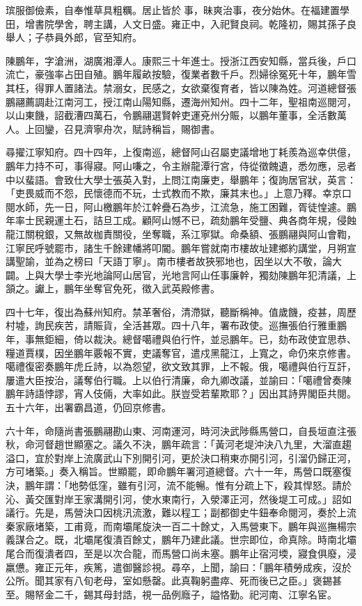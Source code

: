 \begin{pinyinscope}
瑸服御儉素，自奉惟草具粗糲。居止皆於事，昧爽治事，夜分始休。在福建置學田，增書院學舍，聘主講，人文日盛。雍正中，入祀賢良祠。乾隆初，賜其孫子良舉人；子恭員外郎，官至知府。

陳鵬年，字滄洲，湖廣湘潭人。康熙三十年進士。授浙江西安知縣，當兵後，戶口流亡，豪強率占田自殖。鵬年履畝按驗，復業者數千戶。烈婦徐冤死十年，鵬年雪其枉，得罪人置諸法。禁溺女，民感之，女欲棄復育者，皆以陳為姓。河道總督張鵬翮薦調赴江南河工，授江南山陽知縣，遷海州知州。四十二年，聖祖南巡閱河，以山東饑，詔截漕四萬石，令鵬翮選賢幹吏運兗州分賑，以鵬年董事，全活數萬人。上回鑾，召見濟寧舟次，賦詩稱旨，賜御書。

尋擢江寧知府。四十四年，上復南巡，總督阿山召屬吏議增地丁耗羨為巡幸供億，鵬年力持不可，事得寢。阿山嗛之，令主辦龍潭行宮，侍從徵餽遺，悉勿應，忌者中以蜚語。會致仕大學士張英入對，上問江南廉吏，舉鵬年；復詢居官狀，英言：「吏畏威而不怨，民懷德而不玩，士式教而不欺，廉其末也。」上意乃釋。幸京口閱水師，先一日，阿山檄鵬年於江幹疊石為步，江流急，施工困難，胥徒惶遽。鵬年率士民親運土石，詰旦工成。顧阿山憾不已，疏劾鵬年受鹽、典各商年規，侵蝕龍江關稅銀，又無故枷責關役，坐奪職，系江寧獄。命桑額、張鵬翮與阿山會鞫，江寧民呼號罷市，諸生千餘建幡將叩閽。鵬年嘗就南市樓故址建鄉約講堂，月朔宣講聖諭，並為之榜曰「天語丁寧」。南市樓者故狹邪地也，因坐以大不敬，論大闢。上與大學士李光地論阿山居官，光地言阿山任事廉幹，獨劾陳鵬年犯清議，上頷之。讞上，鵬年坐奪官免死，徵入武英殿修書。

四十七年，復出為蘇州知府。禁革奢俗，清滯獄，聽斷稱神。值歲饑，疫甚，周歷村墟，詢民疾苦，請賑貨，全活甚眾。四十八年，署布政使。巡撫張伯行雅重鵬年，事無鉅細，倚以裁決。總督噶禮與伯行忤，並忌鵬年。已，劾布政使宜思恭、糧道賈樸，因坐鵬年覈報不實，吏議奪官，遣戍黑龍江，上寬之，命仍來京修書。噶禮復密奏鵬年虎丘詩，以為怨望，欲文致其罪，上不報。俄，噶禮與伯行互訐，屢遣大臣按治，議奪伯行職。上以伯行清廉，命九卿改議，並諭曰：「噶禮曾奏陳鵬年詩語悖謬，宵人伎倆，大率如此。朕豈受若輩欺耶？」因出其詩畀閣臣共閱。五十六年，出署霸昌道，仍回京修書。

六十年，命隨尚書張鵬翮勘山東、河南運河，時河決武陟縣馬營口，自長垣直注張秋，命河督趙世顯塞之。議久不決，鵬年疏言：「黃河老堤沖決八九里，大溜直趨溢口，宜於對岸上流廣武山下別開引河，更於決口稍東亦開引河，引溜仍歸正河，方可堵築。」奏入稱旨。世顯罷，即命鵬年署河道總督。六十一年，馬營口既塞復決，鵬年謂：「地勢低窪，雖有引河，流不能暢。惟有分疏上下，殺其悍怒。請於沁、黃交匯對岸王家溝開引河，使水東南行，入滎澤正河，然後堤工可成。」詔如議行。先是，馬營決口因桃汛流激，難以程工；副都御史牛鈕奉命閱河，奏於上流秦家廠堵築，工甫竟，而南壩尾旋決一百二十餘丈，入馬營東下。鵬年與巡撫楊宗義謀合之。既，北壩尾復潰百餘丈，鵬年乃建此議。世宗即位，命真除。時南北壩尾合而復潰者四，至是以次合龍，而馬營口尚未塞。鵬年止宿河堧，寢食俱廢，浸羸憊。雍正元年，疾篤，遣御醫診視。尋卒，上聞，諭曰：「鵬年積勞成疾，沒於公所。聞其家有八旬老母，室如懸罄。此真鞠躬盡瘁、死而後已之臣。」褒錫甚至。賜帑金二千，錫其母封誥，視一品例廕子，謚恪勤。祀河南、江寧名宦。


\end{pinyinscope}
